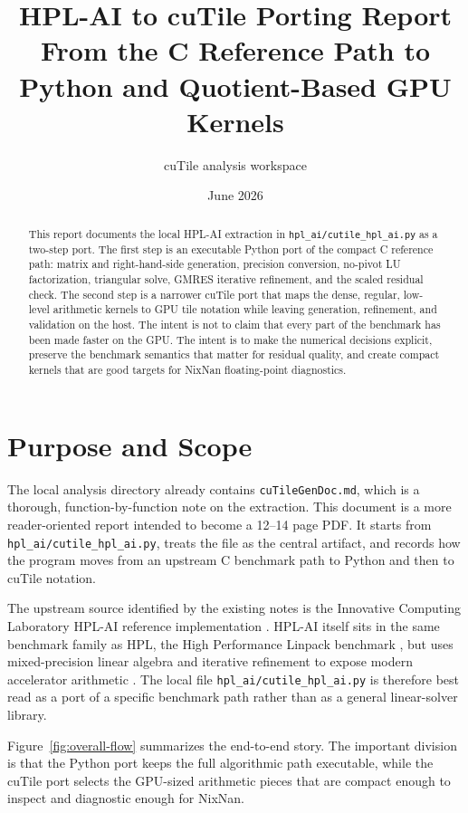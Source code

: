 \documentclass[11pt]{article}
\title{HPL-AI to cuTile Porting Report\\
\large From the C Reference Path to Python and Quotient-Based GPU Kernels}
\author{cuTile analysis workspace}
\date{June 2026}
\newcommand{\filecutile}{\texttt{hpl\_ai/cutile\_hpl\_ai.py}}
\newcommand{\filedoc}{\texttt{cuTileGenDoc.md}}
\newcommand{\hplai}{HPL-AI}
\newcommand{\cutile}{cuTile}
\newcommand{\nixnan}{NixNan}
\begin{document}
\maketitle

\begin{abstract}
This report documents the local \hplai{} extraction in \filecutile{} as a
two-step port. The first step is an executable Python port of the compact C
reference path: matrix and right-hand-side generation, precision conversion,
no-pivot LU factorization, triangular solve, GMRES iterative refinement, and
the scaled residual check. The second step is a narrower \cutile{} port that
maps the dense, regular, low-level arithmetic kernels to GPU tile notation
while leaving generation, refinement, and validation on the host. The intent is
not to claim that every part of the benchmark has been made faster on the GPU.
The intent is to make the numerical decisions explicit, preserve the benchmark
semantics that matter for residual quality, and create compact kernels that are
good targets for \nixnan{} floating-point diagnostics.
\end{abstract}

\tableofcontents
\clearpage

\section{Purpose and Scope}

The local analysis directory already contains \filedoc{}, which is a
thorough, function-by-function note on the extraction. This document is a more
reader-oriented report intended to become a 12--14 page PDF. It starts from
\filecutile{}, treats the file as the central artifact, and records how the
program moves from an upstream C benchmark path to Python and then to \cutile{}
notation.

The upstream source identified by the existing notes is the Innovative
Computing Laboratory \hplai{} reference implementation
\cite{icl-hpl-ai}. \hplai{} itself sits in the same benchmark family as HPL,
the High Performance Linpack benchmark \cite{hpl-netlib}, but uses
mixed-precision linear algebra and iterative refinement to expose modern
accelerator arithmetic \cite{hpl-ai-top500}. The local file \filecutile{} is
therefore best read as a port of a specific benchmark path rather than as a
general linear-solver library.

Figure~\ref{fig:overall-flow} summarizes the end-to-end story. The important
division is that the Python port keeps the full algorithmic path executable,
while the \cutile{} port selects the GPU-sized arithmetic pieces that are
compact enough to inspect and diagnostic enough for \nixnan{}.
\end{document}
